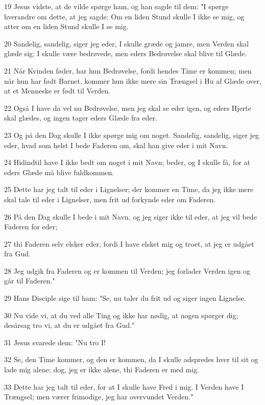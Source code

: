 \par 19 Jesus vidste, at de vilde spørge ham, og han sagde til dem: "I spørge hverandre om dette, at jeg sagde: Om en liden Stund skulle I ikke se mig, og atter om en liden Stund skulle I se mig.
\par 20 Sandelig, sandelig, siger jeg eder, I skulle græde og jamre, men Verden skal glæde sig; I skulle være bedrøvede, men eders Bedrøvelse skal blive til Glæde.
\par 21 Når Kvinden føder, har hun Bedrøvelse, fordi hendes Time er kommen; men når hun har født Barnet, kommer hun ikke mere sin Trængsel i Hu af Glæde over, at et Menneske er født til Verden.
\par 22 Også I have da vel nu Bedrøvelse, men jeg skal se eder igen, og eders Hjerte skal glædes, og ingen tager eders Glæde fra eder.
\par 23 Og på den Dag skulle I ikke spørge mig om noget. Sandelig, sandelig, siger jeg eder, hvad som helst I bede Faderen om, skal han give eder i mit Navn.
\par 24 Hidindtil have I ikke bedt om noget i mit Navn; beder, og I skulle få, for at eders Glæde må blive fuldkommen.
\par 25 Dette har jeg talt til eder i Lignelser; der kommer en Time, da jeg ikke mere skal tale til eder i Lignelser, men frit ud forkynde eder om Faderen.
\par 26 På den Dag skulle I bede i mit Navn, og jeg siger ikke til eder, at jeg vil bede Faderen for eder;
\par 27 thi Faderen selv elsker eder, fordi I have elsket mig og troet, at jeg er udgået fra Gud.
\par 28 Jeg udgik fra Faderen og er kommen til Verden; jeg forlader Verden igen og går til Faderen."
\par 29 Hans Disciple sige til ham: "Se, nu taler du frit ud og siger ingen Lignelse.
\par 30 Nu vide vi, at du ved alle Ting og ikke har nødig, at nogen spørger dig; desårsag tro vi, at du er udgået fra Gud."
\par 31 Jesus svarede dem: "Nu tro I!
\par 32 Se, den Time kommer, og den er kommen, da I skulle adspredes hver til sit og lade mig alene; dog, jeg er ikke alene, thi Faderen er med mig.
\par 33 Dette har jeg talt til eder, for at I skulle have Fred i mig. I Verden have I Trængsel; men værer frimodige, jeg har overvundet Verden."

